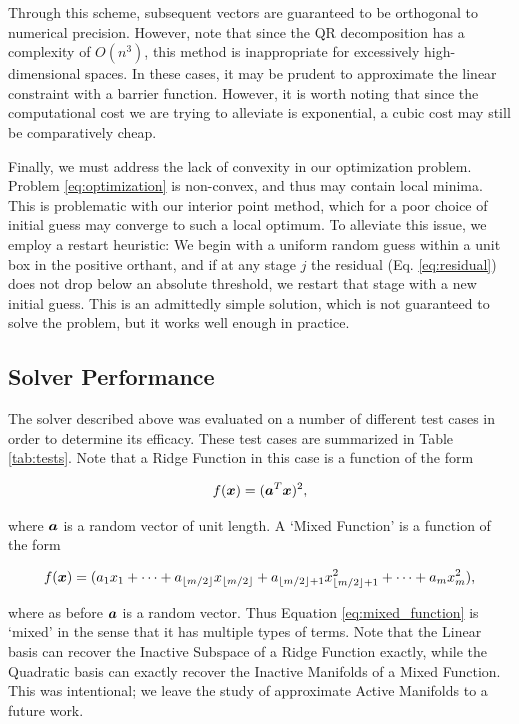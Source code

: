 \documentclass[]{aiaa-tc}%
\begin{document}
Through this scheme, subsequent vectors are guaranteed to be orthogonal to numerical precision. However, note that since the QR decomposition has a complexity of $O(n^3)$, this method is inappropriate for excessively high-dimensional spaces. In these cases, it may be prudent to approximate the linear constraint with a barrier function. However, it is worth noting that since the computational cost we are trying to alleviate is exponential, a cubic cost may still be comparatively cheap.

Finally, we must address the lack of convexity in our optimization problem. Problem \ref{eq:optimization} is non-convex, and thus may contain local minima. This is problematic with our interior point method, which for a poor choice of initial guess may converge to such a local optimum. To alleviate this issue, we employ a restart heuristic: We begin with a uniform random guess within a unit box in the positive orthant, and if at any stage $j$ the residual (Eq. \ref{eq:residual}) does not drop below an absolute threshold, we restart that stage with a new initial guess. This is an admittedly simple solution, which is not guaranteed to solve the problem, but it works well enough in practice.

\subsection{Solver Performance} \label{sec:solver_performance}
The solver described above was evaluated on a number of different test cases in order to determine its efficacy. These test cases are summarized in Table \ref{tab:tests}. Note that a Ridge Function in this case is a function of the form 

\begin{equation}
\label{eq:ridge_function}
f(\vx)=(\va^T\vx)^2, 
\end{equation}

where $\boldsymbol{a}$ is a random vector of unit length. A `Mixed Function' is a function of the form 

\begin{equation}
\label{eq:mixed_function}
f(\vx)=(a_1x_1+\dots+a_{\floor*{m/2}}x_{\floor*{m/2}}+a_{\floor*{m/2}+1}x_{\floor*{m/2}+1}^2+\dots+a_mx_m^2),
\end{equation}

where as before $\boldsymbol{a}$ is a random vector. Thus Equation \ref{eq:mixed_function} is `mixed' in the sense that it has multiple types of terms. Note that the Linear basis can recover the Inactive Subspace of a Ridge Function exactly, while the Quadratic basis can exactly recover the Inactive Manifolds of a Mixed Function. This was intentional; we leave the study of approximate Active Manifolds to a future work. 
\end{document}
